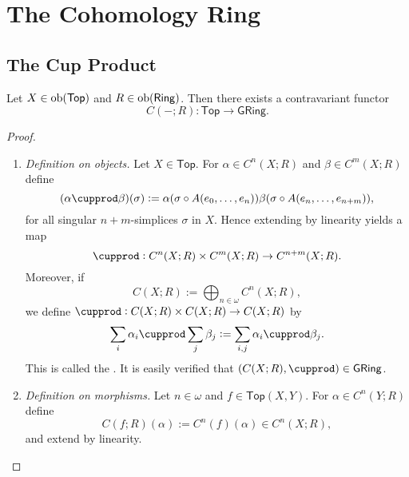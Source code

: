 \section*{The Cohomology Ring}
\subsection*{The Cup Product}

\begin{proposition}
	Let $X \in \operatorname{ob}(\mathsf{Top})$ and $R \in \operatorname{ob}(\mathsf{Ring})$. Then there exists a contravariant functor
	\begin{equation*}
		C(-;R) : \mathsf{Top} \to \mathsf{GRing}.
	\end{equation*}
\end{proposition}

\begin{proof}
	~
	\begin{enumerate}[label = \textit{Step \arabic*:},wide = 0pt]
		\item \textit{Definition on objects.} Let $X \in \mathsf{Top}$. For $\alpha \in C^n(X;R)$
			and $\beta \in C^m(X;R)$ define
			\begin{equation*}
				(\alpha \cupprod \beta)(\sigma) := \alpha(\sigma \circ A(e_0,\dots,e_n)) \beta(\sigma \circ A(e_n,\dots,e_{n + m})),
			\end{equation*}
			\noindent for all singular $n + m$-simplices $\sigma$ in $X$. Hence extending by linearity yields a map
			\begin{equation*}
				\cupprod : C^n(X;R) \times C^m(X;R) \to C^{n + m}(X;R).
			\end{equation*}
			Moreover, if 
			\begin{equation*}
				C(X;R) := \bigoplus_{n \in \omega } C^n(X;R),
			\end{equation*}
			\noindent we define $\cupprod : C(X;R) \times C(X;R) \to C(X;R)$ by
			\begin{equation*}
				\sum_i \alpha_i \cupprod \sum_j \beta_j := \sum_{i,j} \alpha_i \cupprod \beta_j.
			\end{equation*}
			This is called the . It is easily verified that $(C(X;R),\cupprod) \in \mathsf{GRing}$.
		\item \textit{Definition on morphisms.} Let $n \in \omega$ and $f \in \mathsf{Top}(X,Y)$. For $\alpha \in C^n(Y;R)$ define
			\begin{equation*}
				C(f;R)(\alpha) := C^n(f)(\alpha) \in C^n(X;R),
			\end{equation*}
			\noindent and extend by linearity.
	\end{enumerate}
\end{proof}
